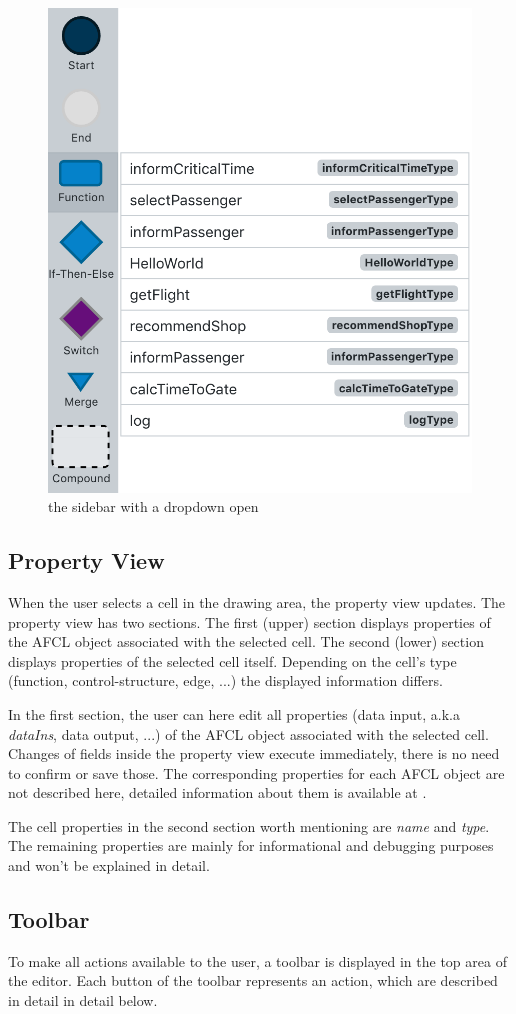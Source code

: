 \documentclass[a4paper,top=25mm,bottom=25mm,12pt,pdftex,halfparskip,twoside,bibtotoc,numbers=noenddot]{scrbook}
\begin{document}
\begin{figure}[H]
\centering
\includegraphics[width=.4\textwidth]{sidebar}
\caption{the sidebar with a dropdown open}
\label{fig:editor-sidebar}
\end{figure}

\subsection{Property View}

When the user selects a cell in the drawing area, the property view updates. The property view has two sections. The first (upper) section displays properties of the AFCL object associated with the selected cell. The second (lower) section displays properties of the selected cell itself. Depending on the cell's type (function, control-structure, edge, ...) the displayed information differs.

In the first section, the user can here edit all properties (data input, a.k.a \textit{dataIns}, data output, ...) of the AFCL object associated with the selected cell. Changes of fields inside the property view execute immediately, there is no need to confirm or save those.
The corresponding properties for each AFCL object are not described here, detailed information about them is available at \citep{online-afcl-dps}.

The cell properties in the second section worth mentioning are \textit{name} and \textit{type}. The remaining properties are mainly for informational and debugging purposes and won't be explained in detail.

\subsection{Toolbar}

To make all actions available to the user, a toolbar is displayed in the top area of the editor. Each button of the toolbar represents an action, which are described in detail in detail below.
\end{document}

